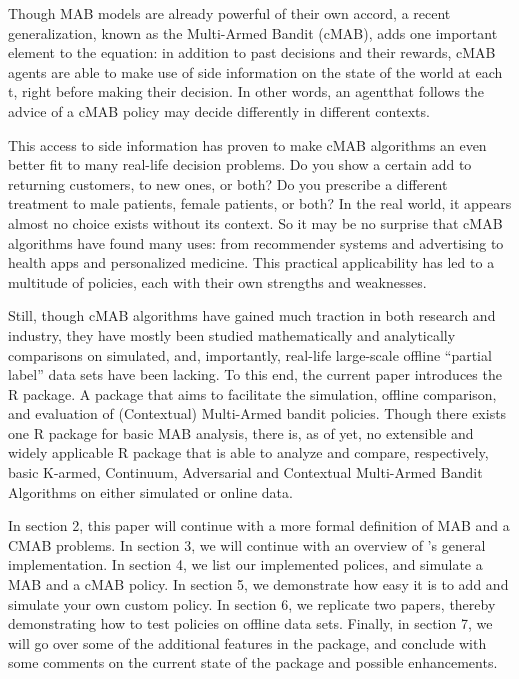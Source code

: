 \documentclass[nojss]{jss}\usepackage[]{graphicx}\usepackage[]{color}
\begin{document}
Though MAB models are already powerful of their own accord, a recent generalization, known as the  Multi-Armed Bandit (cMAB), adds one important element to the equation: in addition to past decisions and their rewards, cMAB agents are able to make use of side information on the state of the world at each t, right before making their decision. In other words, an agentthat follows the advice of a cMAB policy may decide differently in different contexts.

This access to side information has proven to make cMAB algorithms an even better fit to many real-life decision problems. Do you show a certain add to returning customers, to new ones, or both? Do you prescribe a different treatment to male patients, female patients, or both? In the real world, it appears almost no choice exists without its context. So it may be no surprise that cMAB algorithms have found many uses: from recommender systems and advertising to health apps and personalized medicine. This practical applicability has led to a multitude of policies, each with their own strengths and weaknesses.

Still, though cMAB algorithms have gained much traction in both research and industry, they have mostly been studied mathematically and analytically \textendash{} comparisons on simulated, and, importantly, real-life large-scale offline \textquotedblleft{}partial label\textquotedblright{} data sets have been lacking. To this end, the current paper introduces the  R package. A package that aims to facilitate the simulation, offline comparison, and evaluation of (Contextual) Multi-Armed bandit policies. Though there exists one R package for basic MAB analysis, there is, as of yet, no extensible and widely applicable R package that is able to analyze and compare, respectively, basic K-armed, Continuum, Adversarial and Contextual Multi-Armed Bandit Algorithms on either simulated or online data.

In section 2, this paper will continue with a more formal definition of MAB and a CMAB problems. In section 3, we will continue with an overview of ’s general implementation. In section 4, we list our implemented polices, and simulate a MAB and a cMAB policy. In section 5, we demonstrate how easy it is to add and simulate your own custom policy. In section 6, we replicate two papers, thereby demonstrating how to test policies on offline data sets. Finally, in section  7, we will go over some of the additional features in the package, and conclude with some comments on the current state of the package and possible enhancements.
\end{document}
